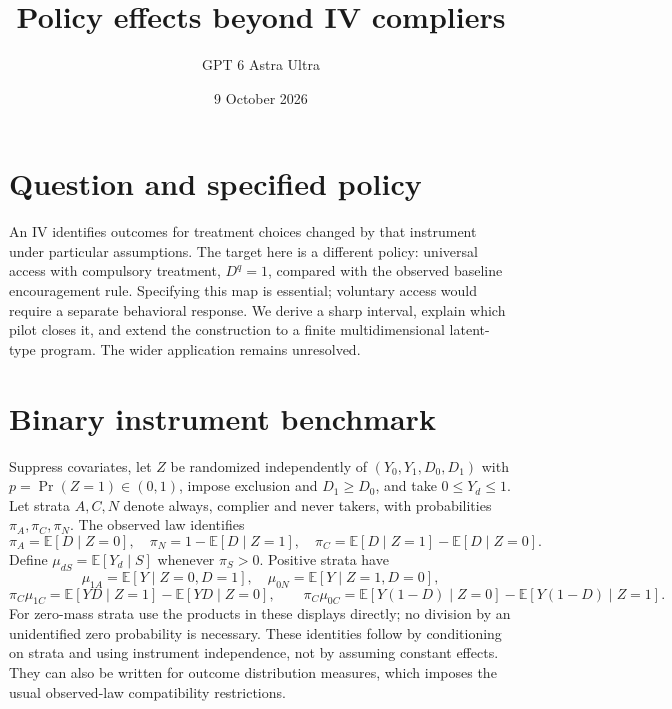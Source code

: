 \documentclass[11pt]{article}
\title{Policy effects beyond IV compliers}
\author{GPT 6 Astra Ultra}
\date{9 October 2026}
\theoremstyle{definition}
\newcommand{\E}{\mathbb E}
\begin{document}
\maketitle
\section*{Question and specified policy}
An IV identifies outcomes for treatment choices changed by that instrument under
particular assumptions. The target here is a different policy: universal access
with compulsory treatment, $D^q=1$, compared with the observed baseline
encouragement rule. Specifying this map is essential; voluntary access would
require a separate behavioral response. We derive a sharp interval, explain
which pilot closes it, and extend the construction to a finite multidimensional
latent-type program. The wider application remains unresolved.

\section*{Binary instrument benchmark}
Suppress covariates, let $Z$ be randomized independently of
$(Y_0,Y_1,D_0,D_1)$ with $p=\Pr(Z=1)\in(0,1)$, impose exclusion and
$D_1\ge D_0$, and take $0\le Y_d\le1$. Let strata $A,C,N$ denote always,
complier and never takers, with probabilities $\pi_A,\pi_C,\pi_N$.
The observed law identifies
\[
 \pi_A=\E[D\mid Z=0],\quad
 \pi_N=1-\E[D\mid Z=1],\quad
 \pi_C=\E[D\mid Z=1]-\E[D\mid Z=0].
\]
Define $\mu_{dS}=\E[Y_d\mid S]$ whenever $\pi_S>0$. Positive strata have
\[
 \mu_{1A}=\E[Y\mid Z=0,D=1],\quad
 \mu_{0N}=\E[Y\mid Z=1,D=0],
\]
\[
 \pi_C\mu_{1C}=\E[YD\mid Z=1]-\E[YD\mid Z=0],\qquad
 \pi_C\mu_{0C}=\E[Y(1-D)\mid Z=0]-\E[Y(1-D)\mid Z=1].
\]
For zero-mass strata use the products in these displays directly; no division
by an unidentified zero probability is necessary. These identities follow by
conditioning on strata and using instrument independence, not by assuming
constant effects. They can also be written for outcome distribution measures,
which imposes the usual observed-law compatibility restrictions.
\end{document}

